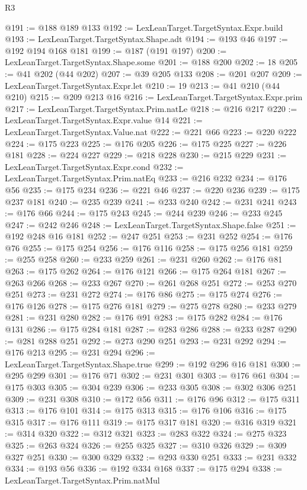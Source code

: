 \begin{lexlean}{R3}
\begin{coremodule}
@191 := @188 @189 @133
@192 := LexLeanTarget.TargetSyntax.Expr.build
@193 := LexLeanTarget.TargetSyntax.Shape.adt
@194 := @193 @46
@197 := @192 @194 @168 @181
@199 := @187 (@191 @197)
@200 := LexLeanTarget.TargetSyntax.Shape.some
@201 := @188 @200
@202 := 18
@205 := @41 @202 (@44 @202)
@207 := @39 @205 @133
@208 := @201 @207
@209 := LexLeanTarget.TargetSyntax.Expr.let
@210 := 19
@213 := @41 @210 (@44 @210)
@215 := @209 @213 @16
@216 := LexLeanTarget.TargetSyntax.Expr.prim
@217 := LexLeanTarget.TargetSyntax.Prim.natLe
@218 := @216 @217
@220 := LexLeanTarget.TargetSyntax.Expr.value @14
@221 := LexLeanTarget.TargetSyntax.Value.nat
@222 := @221 @66
@223 := @220 @222
@224 := @175 @223
@225 := @176 @205
@226 := @175 @225
@227 := @226 @181
@228 := @224 @227
@229 := @218 @228
@230 := @215 @229
@231 := LexLeanTarget.TargetSyntax.Expr.cond
@232 := LexLeanTarget.TargetSyntax.Prim.natEq
@233 := @216 @232
@234 := @176 @56
@235 := @175 @234
@236 := @221 @46
@237 := @220 @236
@239 := @175 @237 @181
@240 := @235 @239
@241 := @233 @240
@242 := @231 @241
@243 := @176 @66
@244 := @175 @243
@245 := @244 @239
@246 := @233 @245
@247 := @242 @246
@248 := LexLeanTarget.TargetSyntax.Shape.false
@251 := @192 @248 @16 @181
@252 := @247 @251
@253 := @231 @252
@254 := @176 @76
@255 := @175 @254
@256 := @176 @116
@258 := @175 @256 @181
@259 := @255 @258
@260 := @233 @259
@261 := @231 @260
@262 := @176 @81
@263 := @175 @262
@264 := @176 @121
@266 := @175 @264 @181
@267 := @263 @266
@268 := @233 @267
@270 := @261 @268 @251
@272 := @253 @270 @251
@273 := @231 @272
@274 := @176 @86
@275 := @175 @274
@276 := @176 @126
@278 := @175 @276 @181
@279 := @275 @278
@280 := @233 @279
@281 := @231 @280
@282 := @176 @91
@283 := @175 @282
@284 := @176 @131
@286 := @175 @284 @181
@287 := @283 @286
@288 := @233 @287
@290 := @281 @288 @251
@292 := @273 @290 @251
@293 := @231 @292
@294 := @176 @213
@295 := @231 @294
@296 := LexLeanTarget.TargetSyntax.Shape.true
@299 := @192 @296 @16 @181
@300 := @295 @299
@301 := @176 @71
@302 := @231 @301
@303 := @176 @61
@304 := @175 @303
@305 := @304 @239
@306 := @233 @305
@308 := @302 @306 @251
@309 := @231 @308
@310 := @172 @56
@311 := @176 @96
@312 := @175 @311
@313 := @176 @101
@314 := @175 @313
@315 := @176 @106
@316 := @175 @315
@317 := @176 @111
@319 := @175 @317 @181
@320 := @316 @319
@321 := @314 @320
@322 := @312 @321
@323 := @283 @322
@324 := @275 @323
@325 := @263 @324
@326 := @255 @325
@327 := @310 @326
@329 := @309 @327 @251
@330 := @300 @329
@332 := @293 @330 @251
@333 := @231 @332
@334 := @193 @56
@336 := @192 @334 @168
@337 := @175 @294
@338 := LexLeanTarget.TargetSyntax.Prim.natMul

\end{coremodule}
\end{lexlean}
